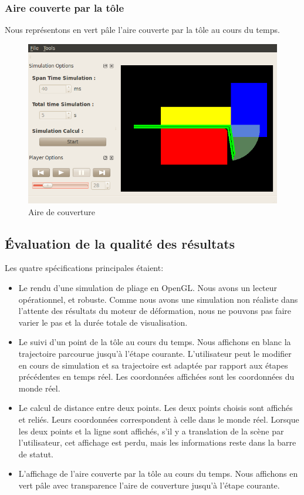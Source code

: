 \documentclass[a4paper, 11pt]{article}
\begin{document}
\subsubsection{Aire couverte par la tôle}
Nous représentons en vert pâle l'aire couverte par la tôle au cours du temps.
\begin{figure}[H]
    \begin{center}
        \includegraphics[width=.8\textwidth]{img/area.png}
    \end{center}
    \caption{Aire de couverture}
\end{figure}

\subsection{Évaluation de la qualité des résultats}
Les quatre spécifications principales étaient:
\begin{itemize}
        \renewcommand{\labelitemi}{$\bullet$}
    \item Le rendu d'une simulation de pliage en OpenGL.
        Nous avons un lecteur opérationnel, et robuste.
        Comme nous avons une simulation non réaliste dans l'attente des résultats du moteur de déformation, nous ne pouvons pas faire varier le pas et la durée totale de visualisation.\\
    \item Le suivi d'un point de la tôle au cours du temps.
        Nous affichons en blanc la trajectoire parcourue jusqu'à l'étape courante.
        L'utilisateur peut le modifier en cours de simulation et sa trajectoire est adaptée par rapport aux étapes précédentes en temps réel.
        Les coordonnées affichées sont les coordonnées du monde réel.\\
    \item Le calcul de distance entre deux points.
        Les deux points choisis sont affichés et reliés.
        Leurs coordonnées correspondent à celle dans le monde réel.
        Lorsque les deux points et la ligne sont affichés, s'il y a translation de la scène par l'utilisateur, cet affichage est perdu, mais les informations reste dans la barre de statut.\\
    \item L'affichage de l'aire couverte par la tôle au cours du temps.
        Nous affichons en vert pâle avec transparence l'aire de couverture jusqu'à l'étape courante.\\
\end{itemize}
\end{document}
